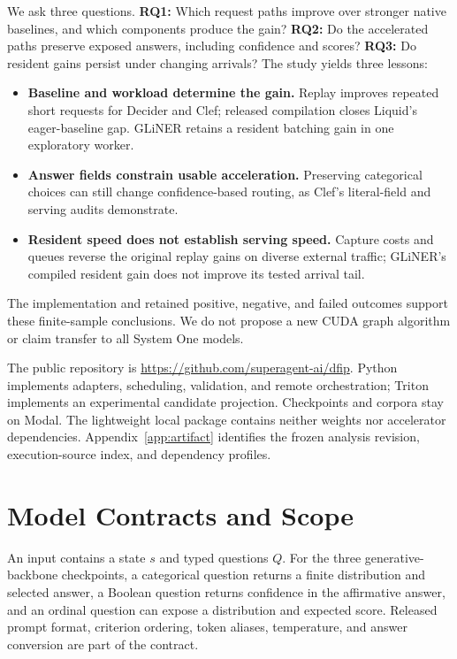 \documentclass[10pt,twocolumn]{article}
\begin{document}
We ask three questions. \textbf{RQ1:} Which request paths improve over stronger native baselines, and which components produce the gain? \textbf{RQ2:} Do the accelerated paths preserve exposed answers, including confidence and scores? \textbf{RQ3:} Do resident gains persist under changing arrivals? The study yields three lessons:
\begin{itemize}
\item \textbf{Baseline and workload determine the gain.} Replay improves repeated short requests for Decider and Clef; released compilation closes Liquid's eager-baseline gap. GLiNER retains a resident batching gain in one exploratory worker.
\item \textbf{Answer fields constrain usable acceleration.} Preserving categorical choices can still change confidence-based routing, as Clef's literal-field and serving audits demonstrate.
\item \textbf{Resident speed does not establish serving speed.} Capture costs and queues reverse the original replay gains on diverse external traffic; GLiNER's compiled resident gain does not improve its tested arrival tail.
\end{itemize}
The implementation and retained positive, negative, and failed outcomes support these finite-sample conclusions. We do not propose a new CUDA graph algorithm or claim transfer to all System One models.

The public repository is \url{https://github.com/superagent-ai/dfip}. Python implements adapters, scheduling, validation, and remote orchestration; Triton~\citep{triton} implements an experimental candidate projection. Checkpoints and corpora stay on Modal. The lightweight local package contains neither weights nor accelerator dependencies. Appendix~\ref{app:artifact} identifies the frozen analysis revision, execution-source index, and dependency profiles.

\section{Model Contracts and Scope}
An input contains a state $s$ and typed questions $Q$. For the three generative-backbone checkpoints, a categorical question returns a finite distribution and selected answer, a Boolean question returns confidence in the affirmative answer, and an ordinal question can expose a distribution and expected score. Released prompt format, criterion ordering, token aliases, temperature, and answer conversion are part of the contract.
\end{document}
